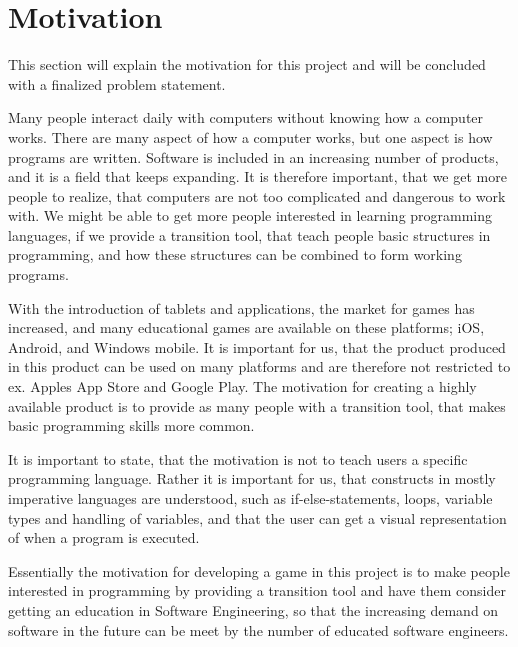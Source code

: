 \section{Motivation}
\label{sec:motivation}

This section will explain the motivation for this project and will be concluded with a finalized problem statement.


Many people interact daily with computers without knowing how a computer works. There are many aspect of how a computer works, but one aspect is how programs are written. Software is included in an increasing number of products, and it is a field that keeps expanding. It is therefore important, that we get more people to realize, that computers are not too complicated and dangerous to work with. We might be able to get more people interested in learning programming languages, if we provide a transition tool, that teach people basic structures in programming, and how these structures can be combined to form working programs.


With the introduction of tablets and applications, the market for games has increased, and many educational games are available on these platforms; iOS, Android, and Windows mobile. It is important for us, that the product produced in this product can be used on many platforms and are therefore not restricted to ex. Apples App Store and Google Play. The motivation for creating a highly available product is to provide as many people with a transition tool, that makes basic programming skills more common.


It is important to state, that the motivation is not to teach users a specific programming language. Rather it is important for us, that constructs in  mostly imperative languages are understood, such as if-else-statements, loops, variable types and handling of variables, and that the user can get a visual representation of when a program is executed.


Essentially the motivation for developing a game in this project is to make people interested in programming by providing a transition tool and have them consider getting an education in Software Engineering, so that the increasing demand on software in the future can be meet by the number of educated software engineers.